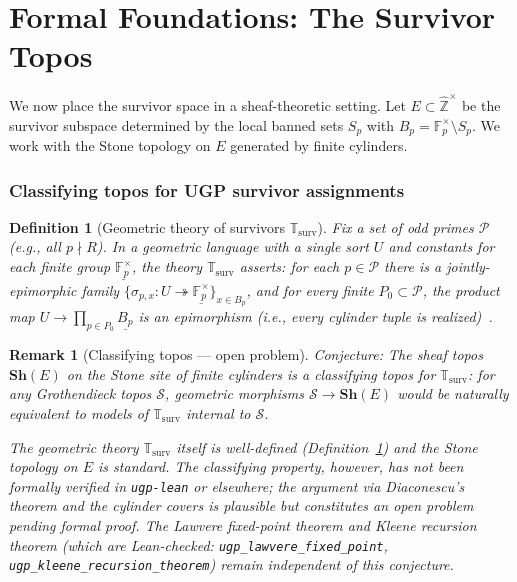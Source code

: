 \documentclass[12pt]{article}
\newtheorem{definition}[theorem]{Definition}
\newtheorem{remark}[theorem]{Remark}
\numberwithin{equation}{section}
\begin{document}
\section{Formal Foundations: The Survivor Topos}

We now place the survivor space in a sheaf-theoretic setting. Let $E\subset \widehat{\mathbb{Z}}^{\times}$ be the survivor subspace determined by the local banned sets $S_p$ with $B_p=\mathbb{F}_p^{\times}\setminus S_p$. We work with the Stone topology on $E$ generated by finite cylinders.

\subsubsection{Classifying topos for UGP survivor assignments}\label{subsec:B3-classifying}

\begin{definition}[Geometric theory of survivors $\mathbb{T}_{\mathrm{surv}}$]\label{def:geom-theory-surv}
Fix a set of odd primes $\mathcal{P}$ (e.g., all $p\nmid R$). In a geometric language with a single sort $U$ and constants for each finite group $\underline{\mathbb{F}_p^{\times}}$, the theory $\mathbb{T}_{\mathrm{surv}}$ asserts: for each $p\in\mathcal{P}$ there is a jointly-epimorphic family $\{\sigma_{p,x}:U\twoheadrightarrow \underline{\mathbb{F}_p^{\times}}\}_{x\in B_p}$, and for every finite $P_0\subset\mathcal{P}$, the product map $U\to \prod_{p\in P_0}\underline{B_p}$ is an epimorphism (i.e., every cylinder tuple is realized)~\cite{SpivackUGPFormalization,ugp-lean}.
\end{definition}

\begin{remark}[Classifying topos — open problem]\label{rem:classifying-topos}
\emph{Conjecture:} The sheaf topos $\mathbf{Sh}(E)$ on the Stone site of finite cylinders is a classifying topos for $\mathbb{T}_{\mathrm{surv}}$: for any Grothendieck topos $\mathcal{S}$, geometric morphisms $\mathcal{S}\to \mathbf{Sh}(E)$ would be naturally equivalent to models of $\mathbb{T}_{\mathrm{surv}}$ internal to $\mathcal{S}$.

The geometric theory $\mathbb{T}_{\mathrm{surv}}$ itself is well-defined (Definition~\ref{def:geom-theory-surv}) and the Stone topology on $E$ is standard. The classifying property, however, has not been formally verified in \texttt{ugp-lean} or elsewhere; the argument via Diaconescu's theorem and the cylinder covers is plausible but constitutes an open problem pending formal proof. The Lawvere fixed-point theorem and Kleene recursion theorem (which are Lean-checked: \texttt{ugp\_lawvere\_fixed\_point}, \texttt{ugp\_kleene\_recursion\_theorem}) remain independent of this conjecture.
\end{remark}
\end{document}
